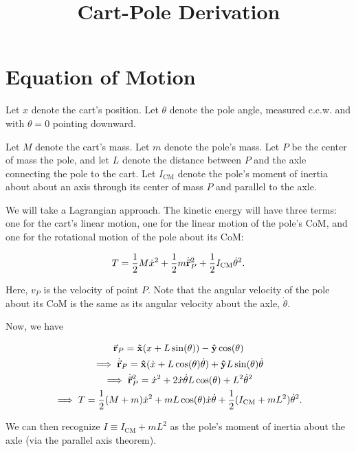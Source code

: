 \documentclass{article}
\title{Cart-Pole Derivation}
\date{}
\begin{document}
    \maketitle

    \tableofcontents

    \section{Equation of Motion}

    Let $x$ denote the cart's position.
    Let $\theta$ denote the pole angle, measured c.c.w. and with $\theta = 0$ pointing downward.

    Let $M$ denote the cart's mass.
    Let $m$ denote the pole's mass.
    Let $P$ be the center of mass the pole, and let $L$ denote the distance between $P$ and the axle connecting the pole to the cart.
    Let $I_\mathrm{CM}$ denote the pole's moment of inertia about about an axis through its center of mass $P$ and parallel to the axle.

    We will take a Lagrangian approach.
    The kinetic energy will have three terms: one for the cart's linear motion, one for the linear motion of the pole's CoM, and one for the rotational motion of the pole about its CoM:

    \[
        T = \frac{1}{2}M\dot{x}^2 + \frac{1}{2}m\dot{\va{r}}_P^2 + \frac{1}{2}I_\mathrm{CM}\dot{\theta}^2.
    \]

    Here, $v_P$ is the velocity of point $P$.
    Note that the angular velocity of the pole about its CoM is the same as its angular velocity about the axle, $\dot{\theta}$.

    Now, we have

    \begin{gather*}
        \va{r}_P = \vu{x}(x + L\sin(\theta)) - \vu{y}\cos(\theta)\\
        \implies \dot{\va{r}}_P = \vu{x}(\dot{x} + L\cos(\theta)\dot{\theta}) + \vu{y}L\sin(\theta)\dot{\theta}\\
        \implies \dot{\va{r}}_P^2 = \dot{x}^2 + 2\dot{x}\dot{\theta}L\cos(\theta) + L^2\dot{\theta}^2\\
        \implies T = \frac{1}{2}(M + m)\dot{x}^2 + mL\cos(\theta)\dot{x}\dot{\theta} + \frac{1}{2}(I_\mathrm{CM} + mL^2)\dot{\theta}^2.
    \end{gather*}

    We can then recognize $I \equiv I_\mathrm{CM} + mL^2$ as the pole's moment of inertia about the axle (via the parallel axis theorem).
\end{document}
